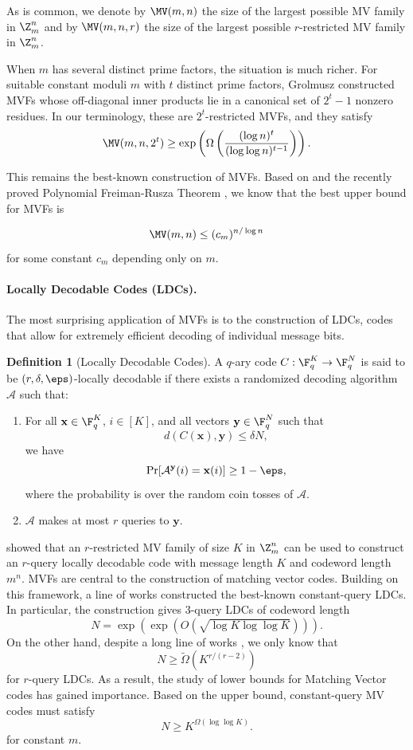 \documentclass[11pt]{article}
\theoremstyle{definition}
\newtheorem{definition}[maintheorem]{Definition}
\begin{document}
As is common, we denote by $\MV(m, n)$ the size of the largest possible MV family in $\Z_m^n$ and by  $\MV(m, n, r)$ the size of the largest possible $r$-restricted MV family in $\Z_m^n$. 

When $m$ has several distinct prime factors, the situation is much richer.
For suitable constant moduli $m$ with $t$ distinct prime factors, Grolmusz
\cite{Grolmusz2000} constructed MVFs whose off-diagonal inner products lie in
a canonical set of $2^t-1$ nonzero residues. In our terminology, these are
$2^t$-restricted MVFs, and they satisfy
\[
\MV(m,n,2^t)
\ge
\exp\left(\Omega\left(
\frac{(\log n)^t}{(\log\log n)^{t-1}}
\right)\right).
\]

This remains the best-known construction of MVFs. Based on \cite{bdl13} and the recently proved Polynomial Freiman-Rusza Theorem \cite{PFR24}, we know that the best upper bound for MVFs is 

\[
\MV(m, n) \leq (c_m)^{n /\log n}
\]
for some constant $c_m$ depending only on $m$.

\paragraph{Locally Decodable Codes (LDCs).}
The most surprising application of MVFs is to the construction of LDCs, codes that allow for extremely efficient decoding of individual message bits. 
\begin{definition}[Locally Decodable Codes]\label{def:ldc}
A $q$-ary code $C:\F_q^K\to\F_q^N$ is said to be $(r,\delta,\eps)$-locally decodable if there exists a randomized decoding algorithm $\mathcal A$ such that:
\begin{enumerate}
    \item For all $\mathbf{x}\in\F_q^K$, $i\in[K]$, and all vectors $\mathbf{y}\in\F_q^N$ such that
    \[
    d(C(\mathbf{x}),\mathbf{y})\le \delta N,
    \]
    we have
    \[
    \Pr[\mathcal A^{\mathbf{y}}(i)=\mathbf{x}(i)]\ge 1-\eps,
    \]
    where the probability is over the random coin tosses of $\mathcal A$.
    \item $\mathcal A$ makes at most $r$ queries to $\mathbf{y}$.
\end{enumerate}
\end{definition}


\cite{Yek08} showed that an $r$-restricted MV family of size $K$ in $\Z_m^n$ can be used to construct an $r$-query locally decodable code with message length $K$ and codeword length $m^n$. MVFs are central to the construction of matching vector codes. Building on this
framework, a line of works \cite{Yek08, Efr09, dvir2011matching} constructed the best-known constant-query
LDCs. In particular, the \cite{Efr09} construction gives $3$-query LDCs of codeword
length
\[
N=\exp\left(\exp\left(O\left(\sqrt{\log K\log\log K}\right)\right)\right).
\]
On the other hand, despite a long line of works \cite{KT00, KW04, GKST06, AGKM23, JM25, BHKL25}, we only know that 
\[
N \geq \tilde{\Omega}(K^{r/(r-2)})
\]
for $r$-query LDCs. As a result, the study of lower bounds for Matching Vector codes has gained importance. Based on the \cite{bdl13} upper bound, constant-query MV codes must satisfy
\[
N\ge K^{\Omega(\log\log K)}.
\]
for constant $m$.
\end{document}
